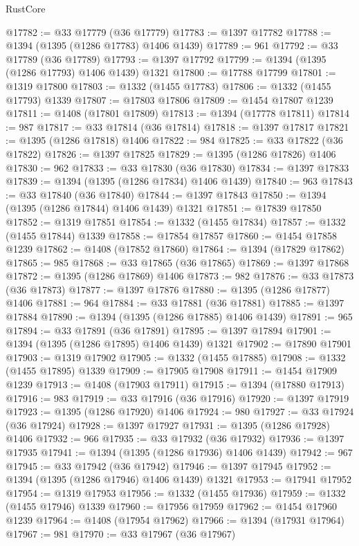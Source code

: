 \begin{lexlean}{RustCore}
\begin{coremodule}
@17782 := @33 @17779 (@36 @17779)
@17783 := @1397 @17782
@17788 := @1394 (@1395 (@1286 @17783) @1406 @1439)
@17789 := 961
@17792 := @33 @17789 (@36 @17789)
@17793 := @1397 @17792
@17799 := @1394 (@1395 (@1286 @17793) @1406 @1439) @1321
@17800 := @17788 @17799
@17801 := @1319 @17800
@17803 := @1332 (@1455 @17783)
@17806 := @1332 (@1455 @17793) @1339
@17807 := @17803 @17806
@17809 := @1454 @17807 @1239
@17811 := @1408 (@17801 @17809)
@17813 := @1394 (@17778 @17811)
@17814 := 987
@17817 := @33 @17814 (@36 @17814)
@17818 := @1397 @17817
@17821 := @1395 (@1286 @17818) @1406
@17822 := 984
@17825 := @33 @17822 (@36 @17822)
@17826 := @1397 @17825
@17829 := @1395 (@1286 @17826) @1406
@17830 := 962
@17833 := @33 @17830 (@36 @17830)
@17834 := @1397 @17833
@17839 := @1394 (@1395 (@1286 @17834) @1406 @1439)
@17840 := 963
@17843 := @33 @17840 (@36 @17840)
@17844 := @1397 @17843
@17850 := @1394 (@1395 (@1286 @17844) @1406 @1439) @1321
@17851 := @17839 @17850
@17852 := @1319 @17851
@17854 := @1332 (@1455 @17834)
@17857 := @1332 (@1455 @17844) @1339
@17858 := @17854 @17857
@17860 := @1454 @17858 @1239
@17862 := @1408 (@17852 @17860)
@17864 := @1394 (@17829 @17862)
@17865 := 985
@17868 := @33 @17865 (@36 @17865)
@17869 := @1397 @17868
@17872 := @1395 (@1286 @17869) @1406
@17873 := 982
@17876 := @33 @17873 (@36 @17873)
@17877 := @1397 @17876
@17880 := @1395 (@1286 @17877) @1406
@17881 := 964
@17884 := @33 @17881 (@36 @17881)
@17885 := @1397 @17884
@17890 := @1394 (@1395 (@1286 @17885) @1406 @1439)
@17891 := 965
@17894 := @33 @17891 (@36 @17891)
@17895 := @1397 @17894
@17901 := @1394 (@1395 (@1286 @17895) @1406 @1439) @1321
@17902 := @17890 @17901
@17903 := @1319 @17902
@17905 := @1332 (@1455 @17885)
@17908 := @1332 (@1455 @17895) @1339
@17909 := @17905 @17908
@17911 := @1454 @17909 @1239
@17913 := @1408 (@17903 @17911)
@17915 := @1394 (@17880 @17913)
@17916 := 983
@17919 := @33 @17916 (@36 @17916)
@17920 := @1397 @17919
@17923 := @1395 (@1286 @17920) @1406
@17924 := 980
@17927 := @33 @17924 (@36 @17924)
@17928 := @1397 @17927
@17931 := @1395 (@1286 @17928) @1406
@17932 := 966
@17935 := @33 @17932 (@36 @17932)
@17936 := @1397 @17935
@17941 := @1394 (@1395 (@1286 @17936) @1406 @1439)
@17942 := 967
@17945 := @33 @17942 (@36 @17942)
@17946 := @1397 @17945
@17952 := @1394 (@1395 (@1286 @17946) @1406 @1439) @1321
@17953 := @17941 @17952
@17954 := @1319 @17953
@17956 := @1332 (@1455 @17936)
@17959 := @1332 (@1455 @17946) @1339
@17960 := @17956 @17959
@17962 := @1454 @17960 @1239
@17964 := @1408 (@17954 @17962)
@17966 := @1394 (@17931 @17964)
@17967 := 981
@17970 := @33 @17967 (@36 @17967)

\end{coremodule}
\end{lexlean}
